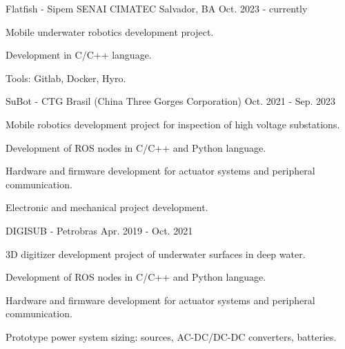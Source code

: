 

\begin{cventries}

\cventry
{Flatfish - Sipem} %
{SENAI CIMATEC} %
{Salvador, BA} %
{Oct. 2023 - currently} %
{
  \begin{cvitems} %
    \item {Mobile underwater robotics development project.}
    \item {Development in C/C++ language.}
    \item {Tools: Gitlab, Docker, Hyro.}
  \end{cvitems}
}

  \cventry
    {SuBot - CTG Brasil (China Three Gorges Corporation)} %
    {} %
    {} %
    {Oct. 2021 - Sep. 2023} %
    {
      \begin{cvitems} %
        \item {Mobile robotics development project for inspection of high voltage substations.}
        \item {Development of ROS nodes in C/C++ and Python language.}
        \item {Hardware and firmware development for actuator systems and peripheral communication.}
        \item {Electronic and mechanical project development.}
      \end{cvitems}
    }


  \cventry
    {DIGISUB - Petrobras} %
    {} %
    {} %
    {Apr. 2019 - Oct. 2021} %
    {
      \begin{cvitems} %
        \item {3D digitizer development project of underwater surfaces in deep water.}
        \item {Development of ROS nodes in C/C++ and Python language.}
        \item {Hardware and firmware development for actuator systems and peripheral communication.}
        \item {Prototype power system sizing: sources, AC-DC/DC-DC converters, batteries.}
      \end{cvitems}
    }



\end{cventries}
